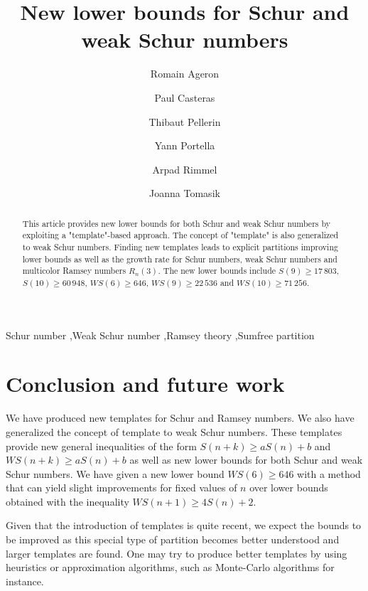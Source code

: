 \documentclass[3p]{elsarticle}
\title{New lower bounds for Schur and weak Schur numbers}
\author[1]{Romain Ageron\fnref{fn1}}
\author[1]{Paul Casteras\fnref{fn1}}
\author[1]{Thibaut Pellerin\fnref{fn1}}
\author[1]{Yann Portella\fnref{fn1}}
\author[2]{Arpad Rimmel\fnref{fn2}}
\author[2]{Joanna Tomasik\corref{cor1}\fnref{fn2}}
\newtheorem{computational theorem}[definition]{Computational Theorem}
\newcommand{\WS}{\mathit{WS}}
\begin{document}
\begin{abstract}

This article provides new lower bounds for both Schur and weak Schur numbers by exploiting a "template"-based approach. 
The concept of "template" is also generalized to weak Schur numbers. Finding new templates leads to explicit partitions 
improving lower bounds as well as the growth rate for Schur numbers, weak Schur numbers and multicolor Ramsey numbers \(R_n(3)\). 
The new lower bounds include \(S(9) \geqslant 17\,803\), \(S(10) \geqslant 60\,948\), \(\WS(6) \geqslant 646\), 
\(\WS (9) \geqslant 22\,536\) and \(\WS (10) \geqslant 71\,256 \).

\end{abstract}

\begin{keyword}
Schur number \sep Weak Schur number \sep Ramsey theory \sep Sumfree partition
\end{keyword}

\maketitle







\section{Conclusion and future work}

We have produced new templates for Schur and Ramsey numbers. We also have generalized the concept of template to weak Schur numbers. 
These templates provide new general inequalities of the form \(S(n+k) \geqslant a S(n) + b\) and \(\WS(n+k) \geqslant a S(n) + b\) 
as well as new lower bounds for both Schur and weak Schur numbers. We have given a new lower bound \(\WS(6) \geqslant 646\) with 
a method that can yield slight improvements for fixed values of \(n\) over lower bounds obtained with the inequality 
\(\WS(n+1) \geqslant 4 S(n) + 2\).

Given that the introduction of templates is quite recent, we expect the bounds to be improved as this special type of partition 
becomes better understood and larger templates are found. One may try to produce better templates by using heuristics or 
approximation algorithms, such as Monte-Carlo algorithms for instance.
\end{document}
